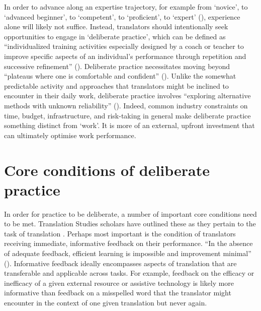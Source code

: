 \documentclass[output=paper]{langscibook}
\begin{document}
In order to advance along an expertise trajectory, for example from ‘novice’, to ‘advanced beginner’, to ‘competent’, to ‘proficient’, to ‘expert’ (\citealt{dd86}), experience alone will likely not suffice. Instead, translators should intentionally seek opportunities to engage in ‘deliberate practice’, which can be defined as “individualized training activities especially designed by a coach or teacher to improve specific aspects of an individual’s performance through repetition and successive refinement” (\citealt[278--279]{ericssonlehmann96}). Deliberate practice necessitates moving beyond “plateaus where one is comfortable and confident” (\citealt[601]{hornmasunaga06}). Unlike the somewhat predictable activity and approaches that translators might be inclined to encounter in their daily work, deliberate practice involves “exploring alternative methods with unknown reliability” (\citealt[368]{ericssonkrampe93}). Indeed, common industry constraints on time, budget, infrastructure, and risk-taking in general make deliberate practice something distinct from ‘work’. It is more of an external, upfront investment that can ultimately optimise work performance.

\section{Core conditions of deliberate practice}\label{sec:2:2}

In order for practice to be deliberate, a number of important core conditions need to be met. Translation Studies scholars have outlined these as they pertain to the task of translation \citep{shreve2006}. Perhaps most important is the condition of translators receiving immediate, informative feedback on their performance. “In the absence of adequate feedback, efficient learning is impossible and improvement minimal” (\citealt[367]{ericssonkrampe93}). Informative feedback ideally encompasses aspects of translation that are transferable and applicable across tasks. For example, feedback on the efficacy or inefficacy of a given external resource or assistive technology is likely more informative than feedback on a misspelled word that the translator might encounter in the context of one given translation but never again.
\end{document}
